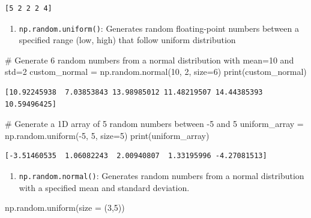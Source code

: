 \documentclass[
  letterpaper,
  DIV=11,
  numbers=noendperiod]{scrreprt}
\newenvironment{Shaded}{\begin{snugshade}}{\end{snugshade}}
\newcommand{\BuiltInTok}[1]{\textcolor[rgb]{0.00,0.23,0.31}{#1}}
\newcommand{\CommentTok}[1]{\textcolor[rgb]{0.37,0.37,0.37}{#1}}
\newcommand{\DecValTok}[1]{\textcolor[rgb]{0.68,0.00,0.00}{#1}}
\newcommand{\NormalTok}[1]{\textcolor[rgb]{0.00,0.23,0.31}{#1}}
\newcommand{\OperatorTok}[1]{\textcolor[rgb]{0.37,0.37,0.37}{#1}}
\providecommand{\tightlist}{%
  \setlength{\itemsep}{0pt}\setlength{\parskip}{0pt}}\usepackage{longtable,booktabs,array}
\begin{document}
\begin{verbatim}
[5 2 2 2 4]
\end{verbatim}

\begin{enumerate}
\def\labelenumi{\arabic{enumi}.}
\setcounter{enumi}{4}
\tightlist
\item
  \texttt{np.random.uniform()}: Generates random floating-point numbers
  between a specified range (low, high) that follow uniform distribution
\end{enumerate}

\begin{Shaded}
\begin{Highlighting}[]
\CommentTok{\# Generate 6 random numbers from a normal distribution with mean=10 and std=2}
\NormalTok{custom\_normal }\OperatorTok{=}\NormalTok{ np.random.normal(}\DecValTok{10}\NormalTok{, }\DecValTok{2}\NormalTok{, size}\OperatorTok{=}\DecValTok{6}\NormalTok{)}
\BuiltInTok{print}\NormalTok{(custom\_normal)}
\end{Highlighting}
\end{Shaded}

\begin{verbatim}
[10.92245938  7.03853843 13.98985012 11.48219507 14.44385393 10.59496425]
\end{verbatim}

\begin{Shaded}
\begin{Highlighting}[]
\CommentTok{\# Generate a 1D array of 5 random numbers between {-}5 and 5}
\NormalTok{uniform\_array }\OperatorTok{=}\NormalTok{ np.random.uniform(}\OperatorTok{{-}}\DecValTok{5}\NormalTok{, }\DecValTok{5}\NormalTok{, size}\OperatorTok{=}\DecValTok{5}\NormalTok{)}
\BuiltInTok{print}\NormalTok{(uniform\_array)}
\end{Highlighting}
\end{Shaded}

\begin{verbatim}
[-3.51460535  1.06082243  2.00940807  1.33195996 -4.27081513]
\end{verbatim}

\begin{enumerate}
\def\labelenumi{\arabic{enumi}.}
\setcounter{enumi}{5}
\tightlist
\item
  \texttt{np.random.normal()}: Generates random numbers from a normal
  distribution with a specified mean and standard deviation.
\end{enumerate}

\begin{Shaded}
\begin{Highlighting}[]
\NormalTok{np.random.uniform(size }\OperatorTok{=}\NormalTok{ (}\DecValTok{3}\NormalTok{,}\DecValTok{5}\NormalTok{))}
\end{Highlighting}
\end{Shaded}
\end{document}
